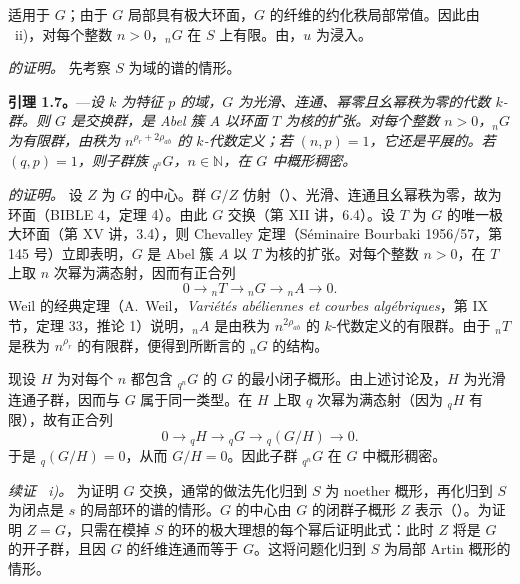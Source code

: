 适用于 \(G\)；由于 \(G\) 局部具有极大环面，\(G\) 的纤维的约化秩局部常值。因此由 ~ii)，对每个整数 \(n>0\)，\({}_{n}G\) 在 \(S\) 上有限。由，\(u\) 为浸入。

\medskip
\noindent\textit{ 的证明。}
先考察 \(S\) 为域的谱的情形。

\medskip
\noindent{}%
\textbf{引理 1.7。}---\textit{设 \(k\) 为特征 \(p\) 的域，\(G\) 为光滑、连通、幂零且幺幂秩为零的代数 \(k\)-群。则 \(G\) 是交换群，是 Abel 簇 \(A\) 以环面 \(T\) 为核的扩张。对每个整数 \(n>0\)，\({}_{n}G\) 为有限群，由秩为 \(n^{\rho_r+2\rho_{ab}}\) 的 \(k\)-代数定义；若 \((n,p)=1\)，它还是平展的。若 \((q,p)=1\)，则子群族 \({}_{q^n}G\)，\(n\in\mathbb N\)，在 \(G\) 中概形稠密。}

\smallskip
\noindent\textit{ 的证明。}
设 \(Z\) 为 \(G\) 的中心。群 \(G/Z\) 仿射（）、光滑、连通且幺幂秩为零，故为环面（BIBLE 4，定理 4）。由此 \(G\) 交换（第 XII 讲，6.4）。设 \(T\) 为 \(G\) 的唯一极大环面（第 XV 讲，3.4），则 Chevalley 定理（Séminaire Bourbaki 1956/57，第 145 号）立即表明，\(G\) 是 Abel 簇 \(A\) 以 \(T\) 为核的扩张。对每个整数 \(n>0\)，在 \(T\) 上取 \(n\) 次幂为满态射，因而有正合列
\[
  0\longrightarrow {}_{n}T\longrightarrow {}_{n}G
  \longrightarrow {}_{n}A\longrightarrow 0.
\]
Weil 的经典定理（A.~Weil，\emph{Variétés abéliennes et courbes algébriques}，第 IX 节，定理 33，推论 1）说明，\({}_{n}A\) 是由秩为 \(n^{2\rho_{ab}}\) 的 \(k\)-代数定义的有限群。由于 \({}_{n}T\) 是秩为 \(n^{\rho_r}\) 的有限群，便得到所断言的 \({}_{n}G\) 的结构。

现设 \(H\) 为对每个 \(n\) 都包含 \({}_{q^n}G\) 的 \(G\) 的最小闭子概形。由上述讨论及，\(H\) 为光滑连通子群，因而与 \(G\) 属于同一类型。在 \(H\) 上取 \(q\) 次幂为满态射（因为 \({}_{q}H\) 有限），故有正合列
\[
  0\longrightarrow {}_{q}H\longrightarrow {}_{q}G
  \longrightarrow {}_{q}(G/H)\longrightarrow 0.
\]
于是 \({}_{q}(G/H)=0\)，从而 \(G/H=0\)。因此子群 \({}_{q^n}G\) 在 \(G\) 中概形稠密。

\smallskip
\noindent\textit{续证 ~i)。}
为证明 \(G\) 交换，通常的做法先化归到 \(S\) 为 noether 概形，再化归到 \(S\) 为闭点是 \(s\) 的局部环的谱的情形。\(G\) 的中心由 \(G\) 的闭群子概形 \(Z\) 表示（）。为证明 \(Z=G\)，只需在模掉 \(S\) 的环的极大理想的每个幂后证明此式：此时 \(Z\) 将是 \(G\) 的开子群，且因 \(G\) 的纤维连通而等于 \(G\)。这将问题化归到 \(S\) 为局部 Artin 概形的情形。

